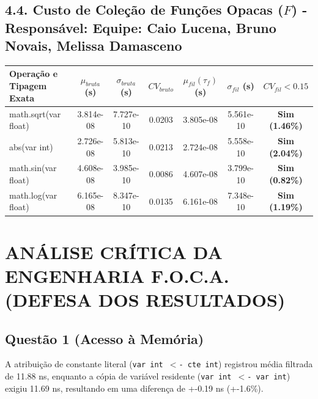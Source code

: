 \documentclass[10pt,a4paper]{article}
\begin{document}
\subsection{4.4. Custo de Coleção de Funções Opacas ($F$) - Responsável: Equipe: Caio Lucena, Bruno Novais, Melissa Damasceno}
\begin{table}[H]
\centering\small
\begin{tabularx}{\textwidth}{Xcccccc}
\toprule
\textbf{Operação e Tipagem Exata} & $\mu_{bruta}$ (s) & $\sigma_{bruta}$ (s) & $CV_{bruto}$ & $\mu_{fil} (\tau_f)$ (s) & $\sigma_{fil}$ (s) & $CV_{fil} < 0.15$ \\ \midrule
math.sqrt(var float) & 3.814e-08 & 7.727e-10 & 0.0203 & 3.805e-08 & 5.561e-10 & \textbf{Sim (1.46\%)} \\
abs(var int) & 2.726e-08 & 5.813e-10 & 0.0213 & 2.724e-08 & 5.558e-10 & \textbf{Sim (2.04\%)} \\
math.sin(var float) & 4.608e-08 & 3.985e-10 & 0.0086 & 4.607e-08 & 3.799e-10 & \textbf{Sim (0.82\%)} \\
math.log(var float) & 6.165e-08 & 8.347e-10 & 0.0135 & 6.161e-08 & 7.348e-10 & \textbf{Sim (1.19\%)} \\
\bottomrule
\end{tabularx}
\end{table}

\section{ANÁLISE CRÍTICA DA ENGENHARIA F.O.C.A. (DEFESA DOS RESULTADOS)}

\subsection*{Questão 1 (Acesso à Memória)}
A atribuição de constante literal (\texttt{var int $<$- cte int}) registrou média filtrada de 11.88 ns, enquanto a cópia de variável residente (\texttt{var int $<$- var int}) exigiu 11.69 ns, resultando em uma diferença de +-0.19 ns (+-1.6\%).
\end{document}
